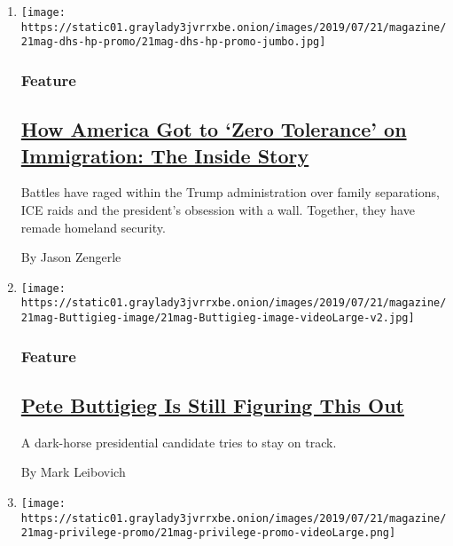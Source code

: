 \begin{enumerate}
\def\labelenumi{\arabic{enumi}.}
\item
  \texttt{[image: https://static01.graylady3jvrrxbe.onion/images/2019/07/21/magazine/21mag-dhs-hp-promo/21mag-dhs-hp-promo-jumbo.jpg]}

  \hypertarget{feature}{%
  \subsubsection{Feature}\label{feature}}

  \hypertarget{how-america-got-to-zero-tolerance-on-immigration-the-inside-story}{%
  \subsection{\texorpdfstring{\href{/2019/07/16/magazine/immigration-department-of-homeland-security.html}{How
  America Got to `Zero Tolerance' on Immigration: The Inside
  Story}}{How America Got to `Zero Tolerance' on Immigration: The Inside Story}}\label{how-america-got-to-zero-tolerance-on-immigration-the-inside-story}}

  Battles have raged within the Trump administration over family
  separations, ICE raids and the president's obsession with a wall.
  Together, they have remade homeland security.

  By Jason Zengerle
\item
  \texttt{[image: https://static01.graylady3jvrrxbe.onion/images/2019/07/21/magazine/21mag-Buttigieg-image/21mag-Buttigieg-image-videoLarge-v2.jpg]}

  \hypertarget{feature-1}{%
  \subsubsection{Feature}\label{feature-1}}

  \hypertarget{pete-buttigieg-is-still-figuring-this-out}{%
  \subsection{\texorpdfstring{\href{/2019/07/18/magazine/pete-buttigieg-2020.html}{Pete
  Buttigieg Is Still Figuring This
  Out}}{Pete Buttigieg Is Still Figuring This Out}}\label{pete-buttigieg-is-still-figuring-this-out}}

  A dark-horse presidential candidate tries to stay on track.

  By Mark Leibovich
\item
  \texttt{[image: https://static01.graylady3jvrrxbe.onion/images/2019/07/21/magazine/21mag-privilege-promo/21mag-privilege-promo-videoLarge.png]}


\end{enumerate}
